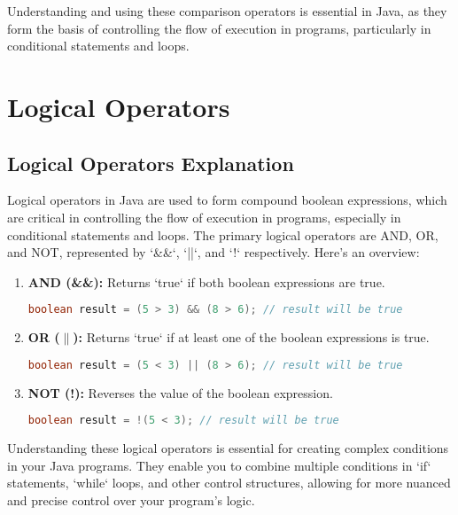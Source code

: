 \documentclass{article}
\begin{document}
\begin{text}

Understanding and using these comparison operators is essential in Java, as they form the basis of controlling the flow of execution in programs, particularly in conditional statements and loops.

\end{text}


\newpage
\section{Logical Operators}
\subsection{Logical Operators Explanation}

Logical operators in Java are used to form compound boolean expressions, which are critical in controlling the flow of execution in programs, especially in conditional statements and loops. The primary logical operators are AND, OR, and NOT, represented by `\&\&`, `||`, and `!` respectively. Here's an overview:

\begin{enumerate}
  \item \textbf{AND (\&\&):}
  Returns `true` if both boolean expressions are true.
  \begin{lstlisting}[language=Java]
boolean result = (5 > 3) && (8 > 6); // result will be true
  \end{lstlisting}

\item \textbf{OR ($\parallel$):}
  Returns `true` if at least one of the boolean expressions is true.
  \begin{lstlisting}[language=Java]
boolean result = (5 < 3) || (8 > 6); // result will be true
  \end{lstlisting}

  \item \textbf{NOT (!):}
  Reverses the value of the boolean expression.
  \begin{lstlisting}[language=Java]
boolean result = !(5 < 3); // result will be true
  \end{lstlisting}
\end{enumerate}


\begin{text}

Understanding these logical operators is essential for creating complex conditions in your Java programs. They enable you to combine multiple conditions in `if` statements, `while` loops, and other control structures, allowing for more nuanced and precise control over your program's logic.

\end{text}
\end{document}
